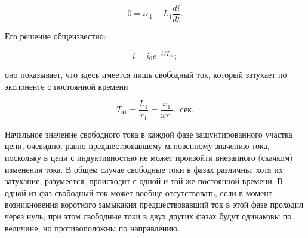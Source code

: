 \begin{equation}
	0 = ir_1 + L_1 \frac{di}{dt}.
	\label{eq:3-1 diff_ur}
\end{equation}

Его решение общеизвестно:

\begin{equation}
	i = i_0 e^{-t / T_{\text{а}1}}; %
	\label{eq:3-2 diff_solve}
\end{equation}

оно показывает, что здесь имеется лишь свободный ток, который затухает по экспоненте с постоянной времени

\begin{equation}
	T_{\text{а}1} = \frac{L_1}{r_1} = \frac{x_1}{\omega r_1}, \textit{~сек}.
	\label{eq:3-3 T_a1}
\end{equation}

Начальное значение свободного тока в каждой фазе зашунтированного участка цепи, очевидно, равно предшествовавшему мгновенному значению тока, поскольку в цепи с индуктивностью не может произойти внезапного (скачком) изменения тока. В общем случае свободные токи в фазах различны, хотя их затухание, разумеется, происходит с одной и той же постоянной времени. В одной из фаз свободный ток может вообще отсутствовать, если в момент возникновения короткого замыкакия предшествовавший ток в этой фазе проходил через нуль; при этом свободные токи в двух других фазах будут одинаковы по величине, но противоположны по направлению.







